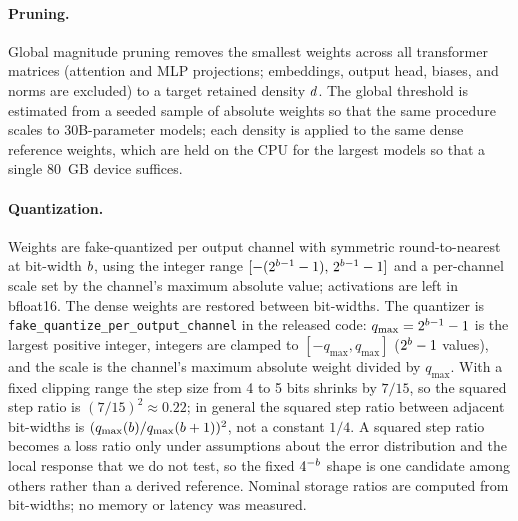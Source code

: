\paragraph{Pruning.} Global magnitude pruning removes the smallest
weights across all transformer matrices (attention and MLP projections;
embeddings, output head, biases, and norms are excluded) to a target
retained density $d$. The global threshold is estimated from a
seeded sample of absolute weights so that the same procedure scales to
30B-parameter models; each density is applied to the same dense
reference weights, which are held on the CPU for the largest models so
that a single 80~GB device suffices.

\paragraph{Quantization.} Weights are fake-quantized per output channel
with symmetric round-to-nearest at bit-width $b$, using the integer
range $[-(2^{b-1}-1),\,2^{b-1}-1]$ and a per-channel scale set
by the channel's maximum absolute value; activations are left in
bfloat16. The dense weights are restored between bit-widths. The quantizer is
\texttt{fake\_quantize\_per\_output\_channel} in the released code:
$q_{\max}=2^{b-1}-1$ is the largest positive integer, integers are
clamped to $[-q_{\max},q_{\max}]$ ($2^{b}-1$ values), and the
scale is the channel's maximum absolute weight divided by $q_{\max}$.
With a fixed clipping range the step size from 4 to 5 bits shrinks by
$7/15$, so the squared step ratio is $(7/15)^2\approx0.22$; in general
the squared step ratio between adjacent bit-widths is
$(q_{\max}(b)/q_{\max}(b+1))^2$, not a constant $1/4$. A
squared step ratio becomes a loss ratio only under assumptions about
the error distribution and the local response that we do not test, so
the fixed $4^{-b}$ shape is one candidate among others rather than a
derived reference. Nominal storage ratios are computed from bit-widths;
no memory or latency was measured.

